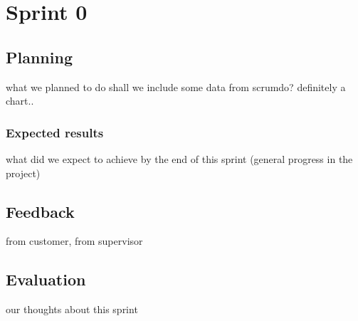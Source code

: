
\chapter{Sprint 0} %

\label{Sprint 0} %



\section{Planning}
what we planned to do
shall we include some data from scrumdo? definitely a chart..
\subsection{Expected results}
what did we expect to achieve by the end of this sprint (general progress in the project)
\section{Feedback}
from customer, from supervisor
\section{Evaluation}
our thoughts about this sprint
